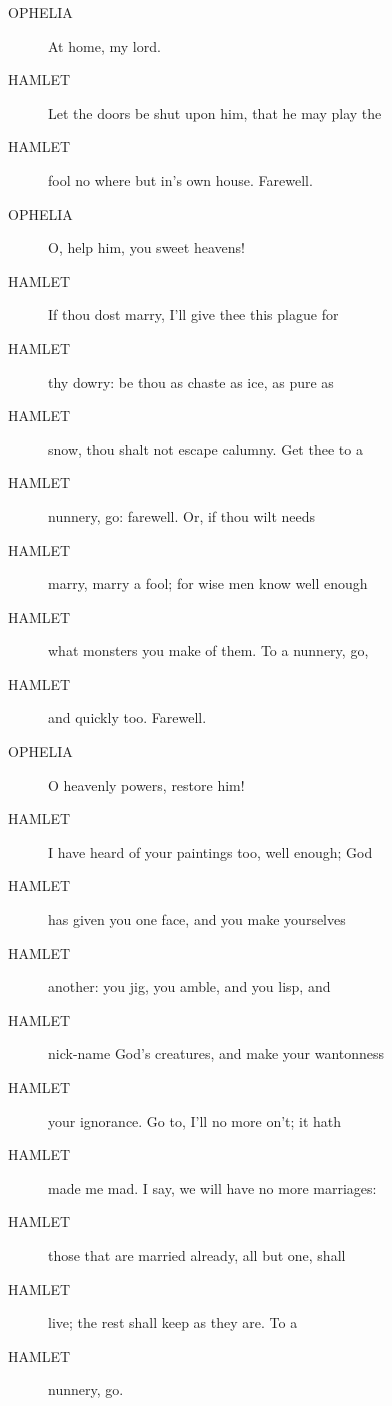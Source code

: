 \documentclass{article}
\begin{document}
\begin{description}
            
\item[OPHELIA] At home, my lord.
\end{description}
          
\begin{description}
            
\item[HAMLET] Let the doors be shut upon him, that he may play the
\item[HAMLET] fool no where but in's own house. Farewell.
\end{description}
          
\begin{description}
            
\item[OPHELIA] O, help him, you sweet heavens!
\end{description}
          
\begin{description}
            
\item[HAMLET] If thou dost marry, I'll give thee this plague for
\item[HAMLET] thy dowry: be thou as chaste as ice, as pure as
\item[HAMLET] snow, thou shalt not escape calumny. Get thee to a
\item[HAMLET] nunnery, go: farewell. Or, if thou wilt needs
\item[HAMLET] marry, marry a fool; for wise men know well enough
\item[HAMLET] what monsters you make of them. To a nunnery, go,
\item[HAMLET] and quickly too. Farewell.
\end{description}
          
\begin{description}
            
\item[OPHELIA] O heavenly powers, restore him!
\end{description}
          
\begin{description}
            
\item[HAMLET] I have heard of your paintings too, well enough; God
\item[HAMLET] has given you one face, and you make yourselves
\item[HAMLET] another: you jig, you amble, and you lisp, and
\item[HAMLET] nick-name God's creatures, and make your wantonness
\item[HAMLET] your ignorance. Go to, I'll no more on't; it hath
\item[HAMLET] made me mad. I say, we will have no more marriages:
\item[HAMLET] those that are married already, all but one, shall
\item[HAMLET] live; the rest shall keep as they are. To a
\item[HAMLET] nunnery, go.
\end{description}
          
\end{document}
